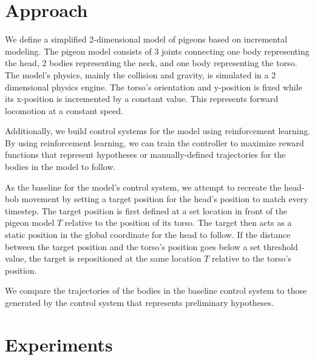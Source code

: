 \chapter{Approach}
  We define a simplified 2-dimensional model of pigeons based on incremental modeling. The pigeon model consists of 3 joints connecting one body representing the head, 2 bodies representing the neck, and one body representing the torso. The model's physics, mainly the collision and gravity, is simulated in a 2 dimensional physics engine. The torso's orientation and y-position is fixed while its x-position is incremented by a constant value. This represents forward locomotion at a constant speed.

  Additionally, we build control systems for the model using reinforcement learning. By using reinforcement learning, we can train the controller to maximize reward functions that represent hypotheses or manually-defined trajectories for the bodies in the model to follow.

  As the baseline for the model's control system, we attempt to recreate the head-bob movement by setting a target position for the head's position to match every timestep. The target position is first defined at a set location in front of the pigeon model $T$ relative to the position of its torso. The target then acts as a static position in the global coordinate for the head to follow. If the distance between the target position and the torso's position goes below a set threshold value, the target is repositioned at the same location $T$ relative to the torso's position.

  We compare the trajectories of the bodies in the baseline control system to those generated by the control system that represents preliminary hypotheses.




\chapter{Experiments}
